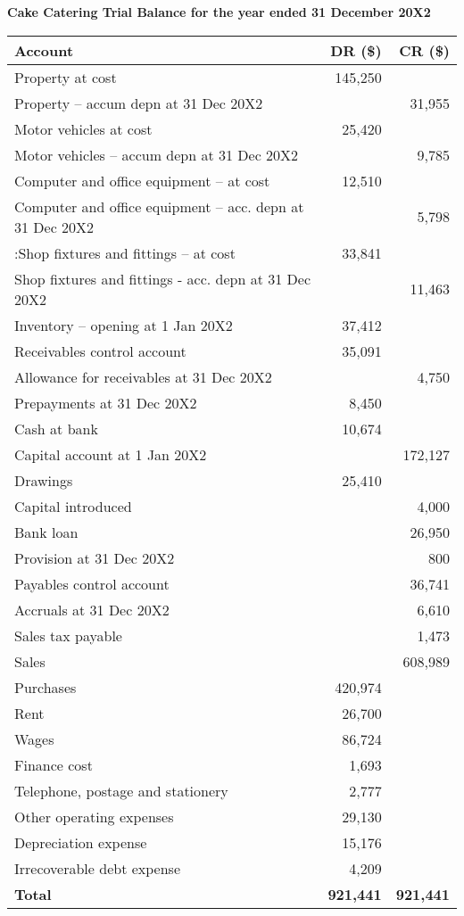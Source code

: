 \textbf{Cake Catering Trial Balance for the year ended 31 December 20X2}

\begin{tabular}{lrr}
\toprule
\textbf{Account} & \textbf{DR (\$)} & \textbf{CR (\$)} \\
\midrule
Property at cost & 145,250 & \\
Property – accum depn at 31 Dec 20X2 & & 31,955 \\
Motor vehicles at cost & 25,420 & \\
Motor vehicles – accum depn at 31 Dec 20X2 & & 9,785 \\
Computer and office equipment – at cost & 12,510 & \\
Computer and office equipment – acc. depn at 31 Dec 20X2 & & 5,798 \\
:Shop fixtures and fittings – at cost & 33,841 & \\
Shop fixtures and fittings - acc. depn at 31 Dec 20X2 & & 11,463 \\
Inventory – opening at 1 Jan 20X2 & 37,412 & \\
Receivables control account & 35,091 & \\
Allowance for receivables at 31 Dec 20X2 & & 4,750 \\
Prepayments at 31 Dec 20X2 & 8,450 & \\
Cash at bank & 10,674 & \\
Capital account at 1 Jan 20X2 & & 172,127 \\
Drawings & 25,410 & \\
Capital introduced & & 4,000 \\
Bank loan & & 26,950 \\
Provision at 31 Dec 20X2 & & 800 \\
Payables control account & & 36,741 \\
Accruals at 31 Dec 20X2 & & 6,610 \\
Sales tax payable & & 1,473 \\
Sales & & 608,989 \\
Purchases & 420,974 & \\
Rent & 26,700 & \\
Wages & 86,724 & \\
Finance cost & 1,693 & \\
Telephone, postage and stationery & 2,777 & \\
Other operating expenses & 29,130 & \\
Depreciation expense & 15,176 & \\
Irrecoverable debt expense & 4,209 & \\
\textbf{Total} & \textbf{921,441} & \textbf{921,441} \\
\bottomrule
\end{tabular}

